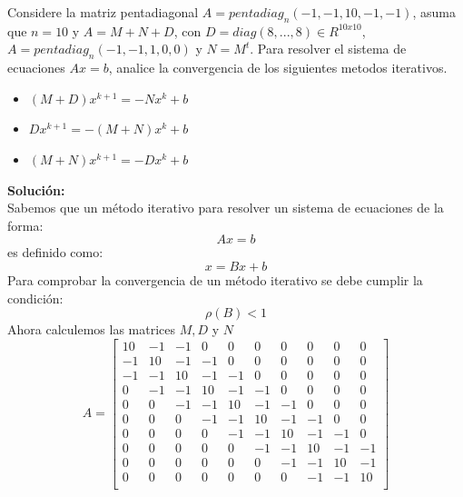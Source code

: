 

Considere la matriz pentadiagonal $A= pentadiag_n(-1,-1,10,-1,-1)$, asuma que $n=10$ y $A=M+N+D$, con $D=diag(8,...,8) \in R^{10x10}$,  $A= pentadiag_n(-1,-1,1,0,0)$ y $N=M^t$. Para resolver el sistema de ecuaciones $Ax=b$, analice la convergencia de los siguientes metodos iterativos.
\begin{itemize}
    \item $(M+D)x^{k+1}=-Nx^k + b$ 
    \item $Dx^{k+1}=-(M+N)x^k + b$
    \item $(M+N)x^{k+1}=-Dx^k + b$
\end{itemize}

\textbf{Solución:}
\\
Sabemos que un método iterativo para resolver un sistema de ecuaciones de la forma:
$$Ax=b$$
es definido como:
$$x=Bx+b$$
Para comprobar la convergencia de un método iterativo se debe cumplir la condición:
$$\rho (B)<1$$ 
Ahora calculemos las matrices $M, D$ y $N$
    $$A=\begin{bmatrix}
    10&-1&-1&0&0&0&0&0&0&0\\
    -1&10&-1&-1&0&0&0&0&0&0\\
    -1&-1&10&-1&-1&0&0&0&0&0\\
    0&-1&-1&10&-1&-1&0&0&0&0\\
    0&0&-1&-1&10&-1&-1&0&0&0\\
    0&0&0&-1&-1&10&-1&-1&0&0\\
    0&0&0&0&-1&-1&10&-1&-1&0\\
    0&0&0&0&0&-1&-1&10&-1&-1\\
    0&0&0&0&0&0&-1&-1&10&-1\\
    0&0&0&0&0&0&0&-1&-1&10\\
    \end{bmatrix}$$
    
